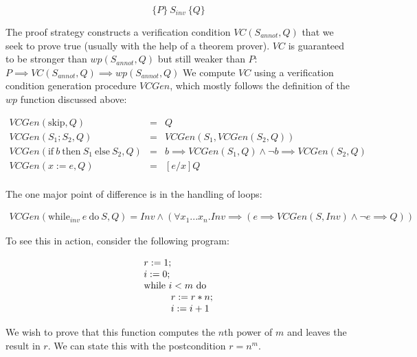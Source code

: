 \documentclass[11pt]{article}
\begin{document}
\[
\{ P \} ~ S_{inv}~ \{ Q \}
\]

The proof strategy constructs a verification condition $VC(S_{annot}, Q)$ that
we seek to prove true (usually with the help of a theorem prover).  $VC$ is
guaranteed to be stronger than $wp(S_{annot}, Q)$ but still weaker than $P$: $P
\implies VC(S_{annot}, Q) \implies wp(S_{annot}, Q)$ We compute $VC$ using a
verification condition generation procedure $VCGen$, which mostly follows the
definition of the $wp$ function discussed above:

\begin{center}
\[
\begin{array}{lcl}
VCGen(\mbox{skip}, Q) & = & Q \\
VCGen(S_1; S_2, Q) & = & VCGen(S_1, VCGen(S_2, Q)) \\
VCGen(\mbox{if}~b~\mbox{then}~S_1~\mbox{else}~S_2, Q) & = & b \implies VCGen(S_1, Q) \wedge \neg b \implies VCGen(S_2, Q) \\
VCGen(x := e, Q) & = & [e/x] Q \\
\end{array}
\]
\end{center}


The one major point of difference is in the handling of loops:

\begin{center}
\[
\begin{array}{l}
VCGen(\mbox{while}_{inv} ~e~\mbox{do}~S, Q) = Inv \wedge (\forall x_1 ... x_n . Inv \implies ( e \implies VCGen(S, Inv) \wedge \neg e \implies Q) )
\end{array}
\]
\end{center}


To see this in action, consider the following \WhileLang program:

\[
\begin{array}{l}
r := 1;\\
i := 0;\\
\mbox{while}~ i<m ~\mbox{do} \\
\hspace{1cm} r:=r*n; \\
\hspace{1cm} i:=i+1
\end{array}
\]

We wish to prove that this function computes the $n$th power of $m$
and leaves the result in $r$.  We can state this with the
postcondition $r=n^m$.
\end{document}
